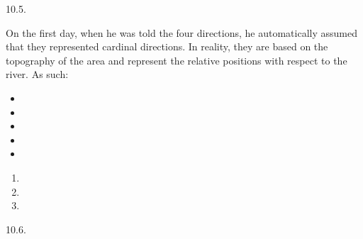 \begin{refsection}
\begin{practiceproblemsolution}{10.5. \langnameEmbaloh}
\begin{solutions}[label=Solution 10.5\alph*]
    \item On the first day, when he was told the four directions, he automatically assumed that they represented cardinal directions. In reality, they are based on the topography of the area and represent the relative positions with respect to the river. As such:
        \begin{itemize}
            \item[] 
            \item[] 
            \item[] 
            \item[] 
            \item[] 
        \end{itemize}
    \item
    \begin{multicols}{3}
        \begin{enumerate}
            \item {}
            \item {}
            \item {}
        \end{enumerate}
    \end{multicols}
\end{solutions}
\end{practiceproblemsolution}



\begin{practiceproblemsolution}{10.6. \langnameHungarian}


\end{practiceproblemsolution}
\end{refsection}
